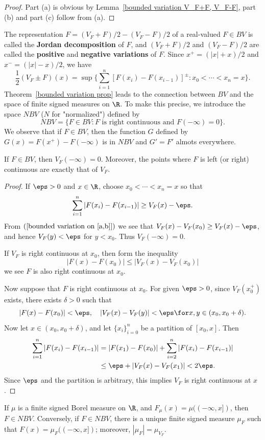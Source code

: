 \begin{proof}
Part (a) is obvious by Lemma~\ref{bounded variation V_F+F, V_F-F}, part (b) and part (c) follow from (a).
\end{proof}
The representation $F=(V_F+F)/2-(V_F-F)/2$ of a real-valued $F\in BV$ is called the \textbf{Jordan decomposition} of $F$, and $(V_F+F)/2$ and $(V_F-F)/2$ are called the \textbf{positive} and \textbf{negative variations} of $F$. Since $x^+=(|x|+x)/2$ and $x^-=(|x|-x)/2$, we have
\[\frac{1}{2}(V_F\pm F)(x)=\sup\{\sum_{i=1}^{n}[F(x_{i})-F(x_{i-1})]^{\pm}:x_0<\cdots<x_n=x\}.\]
Theorem~\ref{bounded variation prop} leads to the connection between $BV$ and the space of finite signed measures on $\R$. To make this precise, we introduce the space $NBV$ ($N$ for "normalized") defined by
\[NBV=\{F\in BV:\text{$F$ is right continuous and $F(-\infty)=0$}\}.\]
We observe that if $F\in BV$, then the function $G$ defined by $G(x)=F(x^+)-F(-\infty)$ is in $NBV$ and $G'=F'$ almots everywhere.
\begin{lemma}\label{bounded variation right continuous}
If $F\in BV$, then $V_F(-\infty)=0$. Moreover, the points where $F$ is left (or right) continuous are exactly that of $V_F$.
\end{lemma}
\begin{proof}
If $\eps>0$ and $x\in\R$, choose $x_0<\cdots<x_n=x$ so that
\[\sum_{i=1}^{n}|F(x_i)-F(x_{i-1})|\geq V_F(x)-\eps.\]
From $(\ref{bounded variation on [a,b]})$ we see that $V_F(x)-V_F(x_0)\geq V_F(x)-\eps$, and hence $V_F(y)<\eps$ for $y<x_0$. Thus $V_F(-\infty)=0$.\par
If $V_F$ is right continuous at $x_0$, then form the inequality
\[|F(x)-F(x_0)|\leq|V_F(x)-V_F(x_0)|\]
we see $F$ is also right continuous at $x_0$.\par
Now suppose that $F$ is right continuous at $x_0$. For given $\eps>0$, since $V_F(x_0^+)$ exists, there exists $\delta>0$ such that
\[|F(x)-F(x_0)|<\eps,\quad|V_F(x)-V_F(y)|<\eps\for x,y\in(x_0,x_0+\delta).\]
Now let $x\in(x_0,x_0+\delta)$, and let $\{x_i\}_{i=0}^{n}$ be a partition of $[x_0,x]$. Then
\begin{align*}
\sum_{i=1}^{n}|F(x_i)-F(x_{i-1})|&=|F(x_1)-F(x_0)|+\sum_{i=2}^{n}|F(x_{i})-F(x_{i-1})|\\
&\leq\eps+|V_F(x)-V_F(x_1)|<2\eps.
\end{align*}
Since $\eps$ and the partition is arbitrary, this implies $V_F$ is right continuous at $x$.
\end{proof}
\begin{theorem}\label{signed measure on R}
If $\mu$ is a finite signed Borel measure on $\R$, and $F_\mu(x)=\mu((-\infty,x])$, then $F\in NBV$. Conversely, if $F\in NBV$, there is a unique finite signed measure $\mu_F$ such that $F(x)=\mu_F((-\infty,x])$; moreover, $|\mu_F|=\mu_{V_F}$.
\end{theorem}
